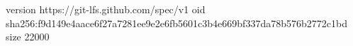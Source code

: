 version https://git-lfs.github.com/spec/v1
oid sha256:f9d149e4aace6f27a7281ee9e2e6fb5601c3b4e669bf337da78b576b2772c1bd
size 22000
